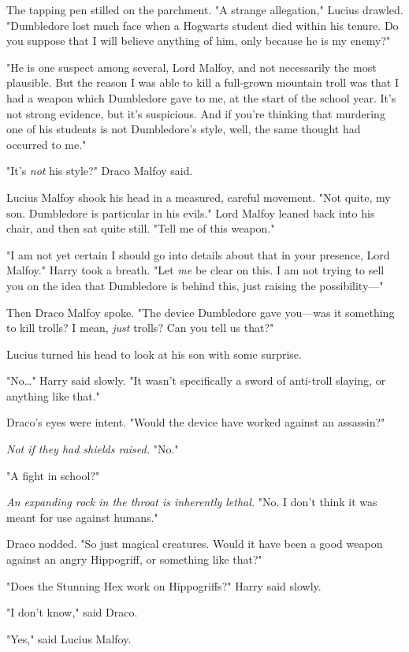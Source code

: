 The tapping pen stilled on the parchment. "A strange allegation," Lucius 
drawled. "Dumbledore lost much face when a Hogwarts student died within his 
tenure. Do you suppose that I will believe anything of him, only because he is 
my enemy?"

"He is one suspect among several, Lord Malfoy, and not necessarily the most 
plausible. But the reason I was able to kill a full-grown mountain troll was 
that I had a weapon which Dumbledore gave to me, at the start of the school 
year. It's not strong evidence, but it's suspicious. And if you're thinking 
that murdering one of his students is not Dumbledore's style, well, the same 
thought had occurred to me."

"It's \emph{not} his style?" Draco Malfoy said.

Lucius Malfoy shook his head in a measured, careful movement. "Not quite, my 
son. Dumbledore is particular in his evils." Lord Malfoy leaned back into his 
chair, and then sat quite still. "Tell me of this weapon."

"I am not yet certain I should go into details about that in your presence, 
Lord Malfoy." Harry took a breath. "Let \emph{me} be clear on this. I am not 
trying to sell you on the idea that Dumbledore is behind this, just raising the 
possibility---"

Then Draco Malfoy spoke. "The device Dumbledore gave you---was it something to 
kill trolls? I mean, \emph{just} trolls? Can you tell us that?"

Lucius turned his head to look at his son with some surprise.

"No{\ldots}" Harry said slowly. "It wasn't specifically a sword of anti-troll 
slaying, or anything like that."

Draco's eyes were intent. "Would the device have worked against an assassin?"

\emph{Not if they had shields raised.} "No."

"A fight in school?"

\emph{An expanding rock in the throat is inherently lethal.} "No. I don't think 
it was meant for use against humans."

Draco nodded. "So just magical creatures. Would it have been a good weapon 
against an angry Hippogriff, or something like that?"

"Does the Stunning Hex work on Hippogriffs?" Harry said slowly.

"I don't know," said Draco.

"Yes," said Lucius Malfoy.

